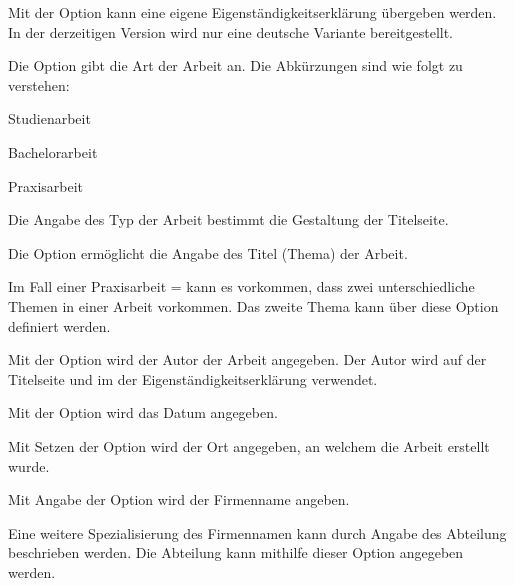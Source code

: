 \documentclass[babel=ngerman,highlight=false]{skdoc}
\begin{document}
            Mit der Option kann eine eigene Eigenständigkeitserklärung übergeben werden. In der derzeitigen Version wird nur eine deutsche Variante bereitgestellt.\medskip
            
            Die Option gibt die Art der Arbeit an. Die Abkürzungen sind wie folgt zu verstehen:
            \begin{description}[noitemsep,style=multiline,leftmargin=1cm]
                \item[SA] Studienarbeit
                \item[BA] Bachelorarbeit
                \item[PA] Praxisarbeit
            \end{description}
            Die Angabe des Typ der Arbeit bestimmt die Gestaltung der Titelseite.\medskip
            
            Die Option ermöglicht die Angabe des Titel (Thema) der Arbeit.\medskip
            
            Im Fall einer Praxisarbeit  =  kann es vorkommen, dass zwei unterschiedliche Themen in einer Arbeit vorkommen. Das zweite Thema kann über diese Option definiert werden.\medskip
            
            Mit der Option wird der Autor der Arbeit angegeben. Der Autor wird auf der Titelseite und im der Eigenständigkeitserklärung verwendet.\medskip
            
            Mit der Option wird das Datum angegeben.\medskip
            
            Mit Setzen der Option wird der Ort angegeben, an welchem die Arbeit erstellt wurde.\medskip
            
            Mit Angabe der Option wird der Firmenname angeben.\medskip
            
            Eine weitere Spezialisierung des Firmennamen kann durch Angabe des Abteilung beschrieben werden. Die Abteilung kann mithilfe dieser Option angegeben werden.\medskip
            
\end{document}

